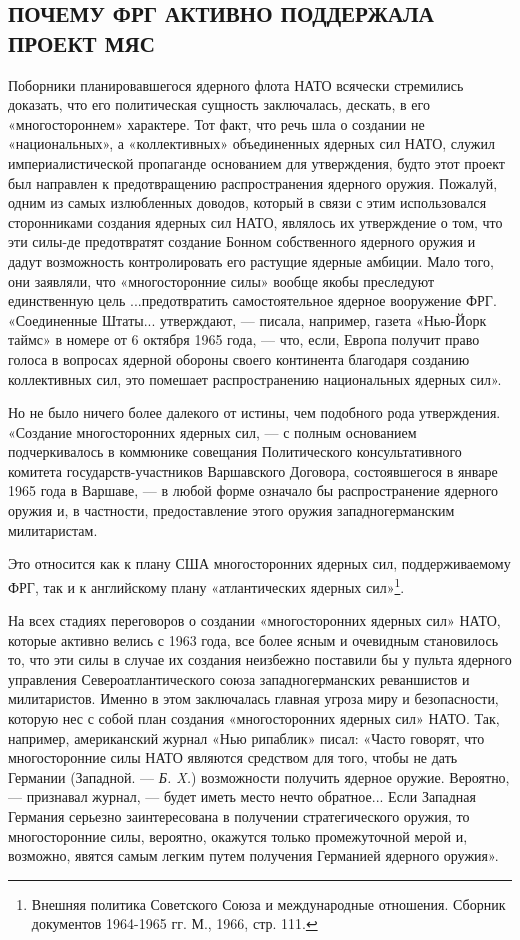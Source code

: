 \documentclass[12pt, a4paper, openany]{book}
\begin{document}
	\subsection[Почему ФРГ активно поддержала проект МЯС]{\center ПОЧЕМУ ФРГ АКТИВНО ПОДДЕРЖАЛА ПРОЕКТ МЯС}
	
	
	Поборники планировавшегося ядерного флота НАТО всячески стремились доказать, что его политическая сущность заключалась, дескать, в его «многостороннем» характере. Тот факт, что речь шла о создании не «национальных», а «коллективных» объединенных ядерных сил НАТО, служил империалистической пропаганде основанием для утверждения, будто этот проект был направлен к предотвращению распространения ядерного оружия. Пожалуй, одним из самых излюбленных доводов, который в связи с этим использовался сторонниками создания ядерных сил НАТО, являлось их утверждение о том, что эти силы-де предотвратят создание Бонном собственного ядерного оружия и дадут возможность контролировать его растущие ядерные амбиции. Мало того, они заявляли, что «многосторонние силы» вообще якобы преследуют единственную цель ...предотвратить самостоятельное ядерное вооружение ФРГ. «Соединенные Штаты... утверждают, — писала, например, газета «Нью-Йорк таймс» в номере от 6 октября 1965 года, — что, если, Европа получит право голоса в вопросах ядерной обороны своего континента благодаря созданию коллективных сил, это помешает распространению национальных ядерных сил».
		
	
	Но не было ничего более далекого от истины, чем подобного рода утверждения. «Создание многосторонних ядерных сил, — с полным основанием подчеркивалось в коммюнике совещания Политического консультативного комитета государств-участников Варшавского Договора, состоявшегося в январе 1965 года в Варшаве, — в любой форме означало бы распространение ядерного оружия и, в частности, предоставление этого оружия западногерманским милитаристам.
	
	Это относится как к плану США многосторонних ядерных сил, поддерживаемому ФРГ, так и к английскому плану «атлантических ядерных сил»{\footnote{Внешняя политика Советского Союза и международные отношения. Сборник документов 1964-1965 гг. М., 1966, стр. 111.}}.
	
На всех стадиях переговоров о создании «многосторонних ядерных сил» НАТО, которые активно велись с 1963 года, все более ясным и очевидным становилось то, что эти силы в случае их создания неизбежно поставили бы у пульта ядерного управления Североатлантического союза западногерманских реваншистов и милитаристов. Именно в этом заключалась главная угроза миру и безопасности, которую нес с собой план создания «многосторонних ядерных сил» НАТО. Так, например, американский журнал «Нью рипаблик» писал: «Часто говорят, что многосторонние силы НАТО являются средством для того, чтобы не дать Германии (Западной. — \textit{Б. X.}) возможности получить ядерное оружие. Вероятно, — признавал журнал, — будет иметь место нечто обратное... Если Западная Германия серьезно заинтересована в получении стратегического оружия, то многосторонние силы, вероятно, окажутся только промежуточной мерой и, возможно, явятся самым легким путем получения Германией ядерного оружия».
	
\end{document}
